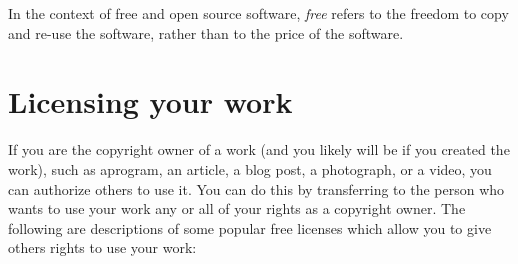 In the context of free and open source software, \emph{free} refers to the freedom to copy and re-use the software, rather than to the price of the software.

\section{Licensing your work\textsuperscript{\cite{license}}}
If you are the copyright owner of a work (and you likely will be if you created the work), such as aprogram, an article, a blog post, a photograph, or a video, you can authorize others to use it. You can do this by transferring to the person who wants to use your work any or all of your rights as a copyright owner. The following are descriptions of some popular free licenses which allow you to give others rights to use your work\textsuperscript{\cite{lic-list}}:
